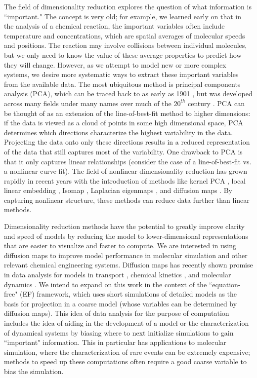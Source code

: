 \documentclass[12pt]{article}
\begin{document}
The field of dimensionality reduction explores the question of what information is ``important." The concept is very old; for example, we learned early on that in the analysis of a chemical reaction, the important variables often include temperature and concentrations, which are spatial averages of molecular speeds and positions. The reaction may involve collisions between individual molecules, but we only need to know the value of these average properties to predict how they will change. However, as we attempt to model new or more complex systems, we desire more systematic ways to extract these important variables from the available data. The most ubiquitous method is principal components analysis (PCA), which can be traced back to as early as 1901 \cite{Pearson1901}, but was developed across many fields under many names over much of the $20^{th}$ century \cite{Hotelling1933, Sirovich1987}. PCA can be thought of as an extension of the line-of-best-fit method to higher dimensions: if the data is viewed as a cloud of points in some high dimensional space, PCA determines which directions characterize the highest variability in the data. Projecting the data onto only these directions results in a reduced representation of the data that still captures most of the variability. One drawback to PCA is that it only captures linear relationships (consider the case of a line-of-best-fit vs. a nonlinear curve fit). The field of nonlinear dimensionality reduction has grown rapidly in recent years with the introduction of methods like kernel PCA \cite{Scholkopf1998}, local linear embedding \cite{Roweis2000}, Isomap \cite{Tenenbaum2000}, Laplacian eigenmaps \cite{Belkin2003}, and diffusion maps \cite{Coifman2005, Coifman2005a, Coifman2006}. By capturing nonlinear structure, these methods can reduce data further than linear methods. \vspace{1mm}

Dimensionality reduction methods have the potential to greatly improve clarity and speed of models by reducing the model to lower-dimensional representations that are easier to visualize and faster to compute. We are interested in using diffusion maps to improve model performance in molecular simulation and other relevant chemical engineering systems. Diffusion maps has recently shown promise in data analysis for models in transport \cite{Sonday2009}, chemical kinetics \cite{Chiavazzo2014}, and molecular dynamics \cite{Ferguson2010, Ferguson2011, Nedialkova2014, Kim2015}. We intend to expand on this work in the context of the ``equation-free" (EF) framework, which uses short simulations of detailed models as the basis for projection in a coarse model (whose variables can be determined by diffusion maps). This idea of data analysis for the purpose of computation includes the idea of aiding in the development of a model or the characterization of dynamical systems by biasing where to next initialize simulations to gain ``important" information. This in particular has applications to molecular simulation, where the characterization of rare events can be extremely expensive; methods to speed up these computations often require a good coarse variable to bias the simulation.  \vspace{1mm}
\end{document}
